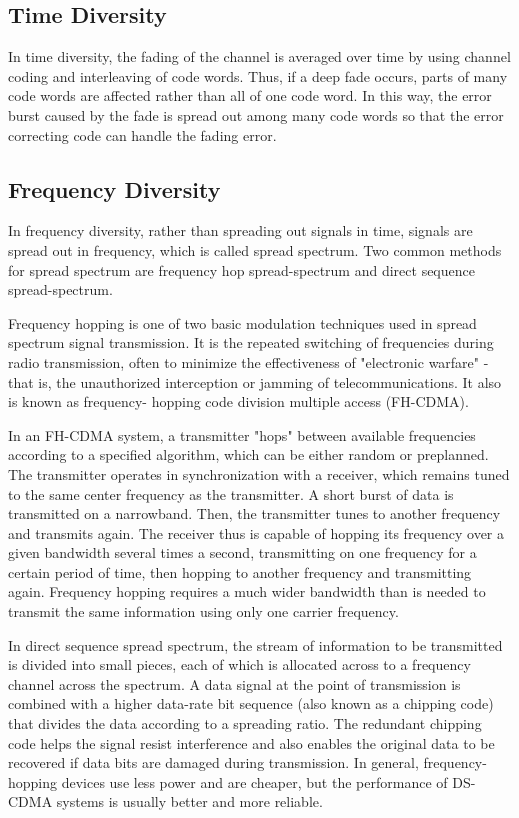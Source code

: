 \subsection{Time Diversity}
In time diversity, the fading of the channel is averaged over time by using channel coding and interleaving of code words. Thus, if a deep fade occurs, parts of many code words are affected rather than all of one code word. In this way, the error burst caused by the fade is spread out among many code words so that the error correcting code can handle the fading error.

\subsection{Frequency Diversity}
In frequency diversity, rather than spreading out signals in time, signals are spread out in frequency, which is called spread spectrum. Two common methods for spread spectrum are frequency hop spread-spectrum and direct sequence spread-spectrum.

Frequency hopping is one of two basic modulation techniques used in spread spectrum signal transmission. It is the repeated switching of frequencies during radio transmission, often to minimize the effectiveness of "electronic warfare" - that is, the unauthorized interception or jamming of telecommunications. It also is known as frequency- hopping code division multiple access (FH-CDMA).

In an FH-CDMA system, a transmitter "hops" between available frequencies according to a specified algorithm, which can be either random or preplanned. The transmitter operates in synchronization with a receiver, which remains tuned to the same center frequency as the transmitter. A short burst of data is transmitted on a narrowband. Then, the transmitter tunes to another frequency and transmits again. The receiver thus is capable of hopping its frequency over a given bandwidth several times a second, transmitting on one frequency for a certain period of time, then hopping to another frequency and transmitting again. Frequency hopping requires a much wider bandwidth than is needed to transmit the same information using only one carrier frequency.

In direct sequence spread spectrum, the stream of information to be transmitted is divided into small pieces, each of which is allocated across to a frequency channel across the spectrum. A data signal at the point of transmission is combined with a higher data-rate bit sequence (also known as a chipping code) that divides the data according to a spreading ratio. The redundant chipping code helps the signal resist interference and also enables the original data to be recovered if data bits are damaged during transmission.
In general, frequency-hopping devices use less power and are cheaper, but the performance of DS-CDMA systems is usually better and more reliable.

